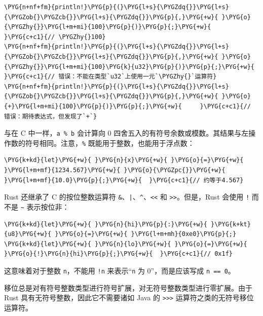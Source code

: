 \begin{Verbatim}[commandchars=\\\{\},breaklines=true,breakanywhere=true,fontsize=\codefont,xleftmargin=17bp]
\PYG{n+nf+fm}{println!}\PYG{p}{(}\PYG{l+s}{\PYGZdq{}}\PYG{l+s}{\PYGZob{}\PYGZcb{}}\PYG{l+s}{\PYGZdq{}}\PYG{p}{,}\PYG{+w}{ }\PYG{o}{\PYGZhy{}}\PYG{l+m+mi}{100}\PYG{p}{)}\PYG{p}{;}\PYG{+w}{     }\PYG{c+c1}{// \PYGZhy{}100}
\PYG{n+nf+fm}{println!}\PYG{p}{(}\PYG{l+s}{\PYGZdq{}}\PYG{l+s}{\PYGZob{}\PYGZcb{}}\PYG{l+s}{\PYGZdq{}}\PYG{p}{,}\PYG{+w}{ }\PYG{o}{\PYGZhy{}}\PYG{l+m+mi}{100}\PYG{k}{u32}\PYG{p}{)}\PYG{p}{;}\PYG{+w}{  }\PYG{c+c1}{// 错误：不能在类型`u32`上使用一元`\PYGZhy{}`运算符}
\PYG{n+nf+fm}{println!}\PYG{p}{(}\PYG{l+s}{\PYGZdq{}}\PYG{l+s}{\PYGZob{}\PYGZcb{}}\PYG{l+s}{\PYGZdq{}}\PYG{p}{,}\PYG{+w}{ }\PYG{o}{+}\PYG{l+m+mi}{100}\PYG{p}{)}\PYG{p}{;}\PYG{+w}{     }\PYG{c+c1}{// 错误：期待表达式，但发现了`+`}
\end{Verbatim}

与在 C 中一样，\texttt{a \% b} 会计算向 0 四舍五入的有符号余数或模数。其结果与左操作数的符号相同。注意，\texttt{\%} 既能用于整数，也能用于浮点数：

\begin{Verbatim}[commandchars=\\\{\},breaklines=true,breakanywhere=true,fontsize=\codefont,xleftmargin=17bp]
\PYG{k+kd}{let}\PYG{+w}{ }\PYG{n}{x}\PYG{+w}{ }\PYG{o}{=}\PYG{+w}{ }\PYG{l+m+mf}{1234.567}\PYG{+w}{ }\PYG{o}{\PYGZpc{}}\PYG{+w}{ }\PYG{l+m+mf}{10.0}\PYG{p}{;}\PYG{+w}{  }\PYG{c+c1}{// 约等于4.567}
\end{Verbatim}

Rust 还继承了 C 的按位整数运算符 \texttt{\&}、\texttt{|}、\texttt{\textasciicircum{}}、\texttt{<<} 和 \texttt{>>}。但是，Rust 会使用 \texttt{!} 而不是 \texttt{\textasciitilde{}} 表示按位非：

\begin{Verbatim}[commandchars=\\\{\},breaklines=true,breakanywhere=true,fontsize=\codefont,xleftmargin=17bp]
\PYG{k+kd}{let}\PYG{+w}{ }\PYG{n}{hi}\PYG{p}{:}\PYG{+w}{ }\PYG{k+kt}{u8}\PYG{+w}{ }\PYG{o}{=}\PYG{+w}{ }\PYG{l+m+mh}{0xe0}\PYG{p}{;}
\PYG{k+kd}{let}\PYG{+w}{ }\PYG{n}{lo}\PYG{+w}{ }\PYG{o}{=}\PYG{+w}{ }\PYG{o}{!}\PYG{n}{hi}\PYG{p}{;}\PYG{+w}{  }\PYG{c+c1}{// 0x1f}
\end{Verbatim}

这意味着对于整数 \texttt{n}，不能用 \texttt{!n} 来表示“\texttt{n} 为 0”，而是应该写成 \texttt{n == 0}。

移位总是对有符号整数类型进行符号扩展，对无符号整数类型进行零扩展。由于 Rust 具有无符号整数，因此它不需要诸如 Java 的 \texttt{>>>} 运算符之类的无符号移位运算符。

